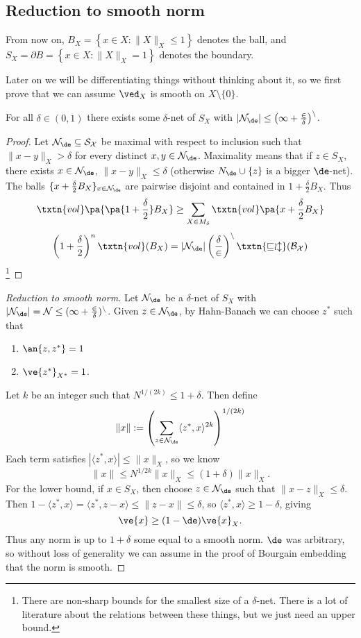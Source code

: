 \subsection{Reduction to smooth norm}
From now on, $B_X = \left\{x \in X: \|X\|_X \leq 1 \right\}$ denotes the ball, and $S_X = \partial B = \left\{x \in X: \|X\|_X = 1\right\}$ denotes the boundary. 

Later on we will be differentiating things without thinking about it, so we first prove that we can assume $\ved_X$ is smooth on $X \setminus \{0\}$. 

\begin{lem} For all $\delta \in (0, 1)$ there exists some $\delta$-net of $S_X$ with $|\cal N_{\de}| \leq \left(1 + \frac{2}{\delta}\right)^n$. 
\end{lem}
\begin{proof}
Let $\cal N_{\de} \subseteq S_X$ be maximal with respect to inclusion such that $\|x - y\|_X > \delta$ for every distinct $x, y \in \cal N_{\de}$. Maximality means that if  $z \in S_{X}$, there exists $x \in \cal N_{\de}$, $\|x - y\|_X \leq \delta$ (otherwise $N_\de\cup \{z\}$ is a bigger $\de$-net). The balls $\{x + \frac{\delta}{2}B_X\}_{x \in \cal N_{\de}}$ are pairwise disjoint and contained in $1 + \frac{\delta}{2}B_X$. Thus
\[
\txtn{vol}\pa{\pa{1 + \frac{\delta}{2}}B_X} \geq \sum_{X \in M_{\delta}} \txtn{vol}\pa{x + \frac{\delta}{2}B_X}
\]
\[
\left(1 + \frac{\delta}{2}\right)^n\txtn{vol}(B_X) = |\cal N_{\de}|\left(\frac{\delta}{2}\right)^n\txtn{vol}(B_X)
\]
\footnote{There are non-sharp bounds for the smallest size of a $\delta$-net. There is a lot of literature about the relations between these things, but we just need an upper bound. }
\end{proof}

\begin{proof}[Reduction to smooth norm]
Let $\cal N_\de$ be a $\delta$-net of $S_X$ with $|\cal N_{\de}| = N \leq (1 + \frac{2}{\delta})^n$. 
Given $z\in \cal N_\de$, by Hahn-Banach we can choose $z^*$ such that 
\begin{enumerate}
\item
$\an{z,z^*} = 1$
\item
$\ve{z^*}_{X^*} = 1$.
\end{enumerate}
Let $k$ be an integer such that $N^{1/(2k)} \leq 1 + \delta$. Then define 
\[
\|x\| := \left(\sum_{z \in \cal N_{\de}} \langle z^*, x \rangle^{2k}\right)^{1/(2k)}
\]
Each term satisfies $|\langle z^*, x \rangle| \leq \|x\|_X$, so we know 
\[\|x\| \leq N^{1/2k}\|x\|_X \leq (1 + \delta)\|x\|_X.\] 
For the lower bound, if $x \in S_X$, then choose $z \in \cal N_{\de}$ such that $\|x - z\|_X \leq \delta$. Then $1 - \langle z^*, x \rangle = \langle z^*, z - x \rangle \leq \|z - x\| \leq \delta$, so $\langle z^*, x \rangle \geq 1 - \delta$, giving 
\[
\ve{x}\ge (1-\de)\ve{x}_X.
\] 
Thus any norm is up to $1 + \delta$ some equal to a smooth norm. %
$\de$ was arbitrary, so without loss of generality we can assume in the proof of Bourgain embedding that the norm is smooth.
\end{proof}


